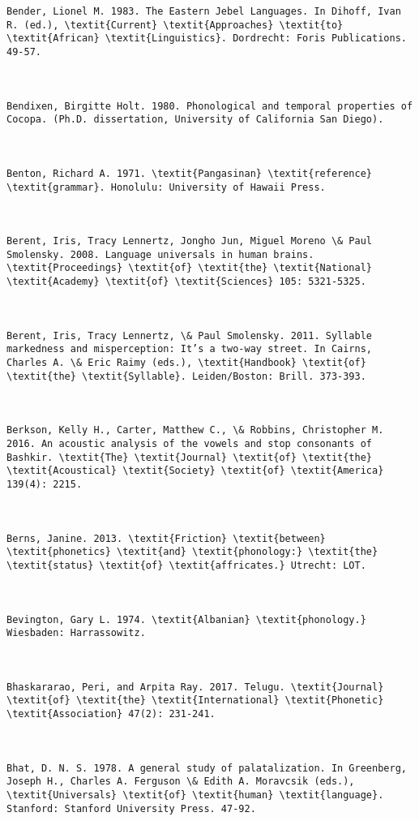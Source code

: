 \begin{verbatim}
Bender, Lionel M. 1983. The Eastern Jebel Languages. In Dihoff, Ivan R. (ed.), \textit{Current} \textit{Approaches} \textit{to} \textit{African} \textit{Linguistics}. Dordrecht: Foris Publications. 49-57.



Bendixen, Birgitte Holt. 1980. Phonological and temporal properties of Cocopa. (Ph.D. dissertation, University of California San Diego).



Benton, Richard A. 1971. \textit{Pangasinan} \textit{reference} \textit{grammar}. Honolulu: University of Hawaii Press.



Berent, Iris, Tracy Lennertz, Jongho Jun, Miguel Moreno \& Paul Smolensky. 2008. Language universals in human brains. \textit{Proceedings} \textit{of} \textit{the} \textit{National} \textit{Academy} \textit{of} \textit{Sciences} 105: 5321-5325. 



Berent, Iris, Tracy Lennertz, \& Paul Smolensky. 2011. Syllable markedness and misperception: It’s a two-way street. In Cairns, Charles A. \& Eric Raimy (eds.), \textit{Handbook} \textit{of} \textit{the} \textit{Syllable}. Leiden/Boston: Brill. 373-393.



Berkson, Kelly H., Carter, Matthew C., \& Robbins, Christopher M. 2016. An acoustic analysis of the vowels and stop consonants of Bashkir. \textit{The} \textit{Journal} \textit{of} \textit{the} \textit{Acoustical} \textit{Society} \textit{of} \textit{America} 139(4): 2215.



Berns, Janine. 2013. \textit{Friction} \textit{between} \textit{phonetics} \textit{and} \textit{phonology:} \textit{the} \textit{status} \textit{of} \textit{affricates.} Utrecht: LOT.



Bevington, Gary L. 1974. \textit{Albanian} \textit{phonology.} Wiesbaden: Harrassowitz.



Bhaskararao, Peri, and Arpita Ray. 2017. Telugu. \textit{Journal} \textit{of} \textit{the} \textit{International} \textit{Phonetic} \textit{Association} 47(2): 231-241.



Bhat, D. N. S. 1978. A general study of palatalization. In Greenberg, Joseph H., Charles A. Ferguson \& Edith A. Moravcsik (eds.), \textit{Universals} \textit{of} \textit{human} \textit{language}. Stanford: Stanford University Press. 47-92.




\end{verbatim}
